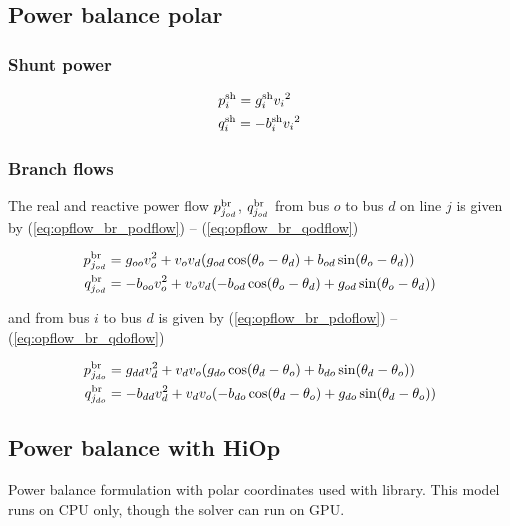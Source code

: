 \subsection{Power balance polar}

\subsubsection{Shunt power}
\begin{align}
&p^{\text{sh}}_i = g^\text{sh}_i{v_i}^2 \label{eq:opflow_sh_p} \\
&q^{\text{sh}}_i = -b^\text{sh}_i{v_i}^2 \label{eq:opflow_sh_q}
\end{align}

\subsubsection{Branch flows}
The real and reactive power flow $p^\text{br}_{j_{od}}$, $q^\text{br}_{j_{od}}$  from bus $o$ to bus $d$ on line $j$ is given by (\ref{eq:opflow_br_podflow}) -- 
 (\ref{eq:opflow_br_qodflow})


\begin{align}
p^\text{br}_{j_{od}} &= g_{oo}{v^2_o} + v_ov_d(g_{od}\cos(\theta_o - \theta_d) + b_{od}\sin(\theta_o - \theta_d)) \label{eq:opflow_br_podflow}\\
q^\text{br}_{j_{od}} &= -b_{oo}{v^2_o} + v_ov_d(-b_{od}\cos(\theta_o - \theta_d) + g_{od}\sin(\theta_o - \theta_d)) \label{eq:opflow_br_qodflow}
\end{align}

and from bus $i$ to bus $d$ is given by (\ref{eq:opflow_br_pdoflow}) -- (\ref{eq:opflow_br_qdoflow})

\begin{align}
p^\text{br}_{j_{do}} &= g_{dd}{v^2_d} + v_dv_o(g_{do}\cos(\theta_d - \theta_o) + b_{do}\sin(\theta_d - \theta_o))  \label{eq:opflow_br_pdoflow} \\
q^\text{br}_{j_{do}} &= -b_{dd}{v^2_d} + v_dv_o(-b_{do}\cos(\theta_d - \theta_o) + g_{do}\sin(\theta_d - \theta_o)) \label{eq:opflow_br_qdoflow}
\end{align}

\begin{comment}
\subsection{Power balance cartesian}
\end{comment}

\subsection{Power balance with HiOp}
Power balance formulation with polar coordinates used with \hiop \cite{hiop-manual} library. This model runs on CPU only, though the \hiop solver can run on GPU.

